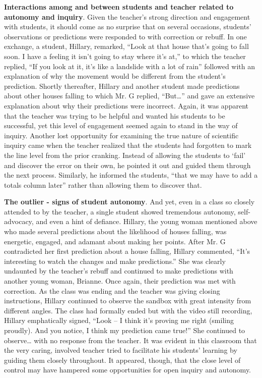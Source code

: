 \documentclass[11.5pt]{sig-alternate} %
\begin{document}
\begin{large}
\textbf{Interactions among and between students and teacher related to autonomy and inquiry}. Given the teacher’s strong direction and engagement with students, it should come as no surprise that on several occasions, students’ observations or predictions were responded to with correction or rebuff. In one exchange, a student, Hillary, remarked, “Look at that house that’s going to fall soon. I have a feeling it isn’t going to stay where it’s at,” to which the teacher replied, “If you look at it, it’s like a landslide with a lot of rain” followed with an explanation of why the movement would be different from the student’s prediction.  Shortly thereafter, Hillary and another student made predictions about other houses falling to which Mr. G replied, “But…” and gave an extensive explanation about why their predictions were incorrect.  Again, it was apparent that the teacher was trying to be helpful and wanted his students to be successful, yet this level of engagement seemed again to stand in the way of inquiry.  Another lost opportunity for examining the true nature of scientific inquiry came when the teacher realized that the students had forgotten to mark the line level from the prior cranking.  Instead of allowing the students to ‘fail’ and discover the error on their own, he pointed it out and guided them through the next process.  Similarly, he informed the students, “that we may have to add a totals column later” rather than allowing them to discover that.  

\textbf{The outlier - signs of student autonomy}. And yet, even in a class so closely attended to by the teacher, a single student showed tremendous autonomy, self-advocacy, and even a hint of defiance.  Hillary, the young woman mentioned above who made several predictions about the likelihood of houses falling, was energetic, engaged, and adamant about making her points.  After Mr. G contradicted her first prediction about a house falling, Hillary commented, “It’s interesting to watch the changes and make predictions.” She was clearly undaunted by the teacher’s rebuff and continued to make predictions with another young woman, Brianne. Once again, their prediction was met with correction.  As the class was ending and the teacher was giving closing instructions, Hillary continued to observe the sandbox with great intensity from different angles.  The class had formally ended but with the video still recording, Hillary emphatically signed, “Look – I think it’s proving me right (smiling proudly).  And you notice, I think my prediction came true!” She continued to observe… with no response from the teacher.  It was evident in this classroom that the very caring, involved teacher tried to facilitate his students’ learning by guiding them closely throughout.  It appeared, though, that the close level of control may have hampered some opportunities for open inquiry and autonomy. 


\end{large}
\end{document}
